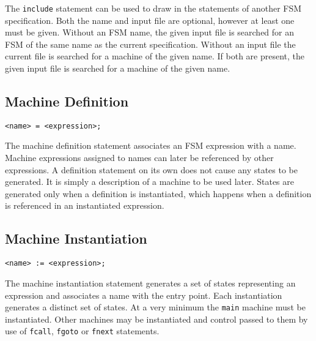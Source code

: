 \documentclass[letterpaper,11pt,oneside]{book}
\newcommand{\verbspace}{\vspace{10pt}}
\begin{document}
The \verb|include| statement can be used to draw in the statements of another FSM
specification. Both the name and input file are optional, however at least one
must be given. Without an FSM name, the given input file is searched for an FSM
of the same name as the current specification. Without an input file the
current file is searched for a machine of the given name. If both are present,
the given input file is searched for a machine of the given name.

\subsection{Machine Definition}
\label{definition}

\begin{verbatim}
<name> = <expression>;
\end{verbatim}
\verbspace

The machine definition statement associates an FSM expression with a name.  Machine
expressions assigned to names can later be referenced by other expressions.  A
definition statement on its own does not cause any states to be generated. It is simply a
description of a machine to be used later. States are generated only when a definition is
instantiated, which happens when a definition is referenced in an instantiated
expression. 

\subsection{Machine Instantiation}
\label{instantiation}

\begin{verbatim}
<name> := <expression>;
\end{verbatim}
\verbspace

The machine instantiation statement generates a set of states representing an expression and
associates a name with the entry point. Each instantiation generates a distinct
set of states.  At a very minimum the \verb|main| machine must be instantiated.
Other machines may be instantiated and control passed to them by use of
\verb|fcall|, \verb|fgoto| or \verb|fnext| statements.

\begin{comment}
\subsection{Write Statement}

\begin{verbatim}
write <component> [options];
\end{verbatim}
\verbspace

The write statement is used to generate parts of the machine. There are four
components that can be generated: the state machine's static data, the
initialization code, the execution code and the EOF action execution code.  The
write statement is described in detail in Section \ref{write-statement}.
\end{comment}
\end{document}
